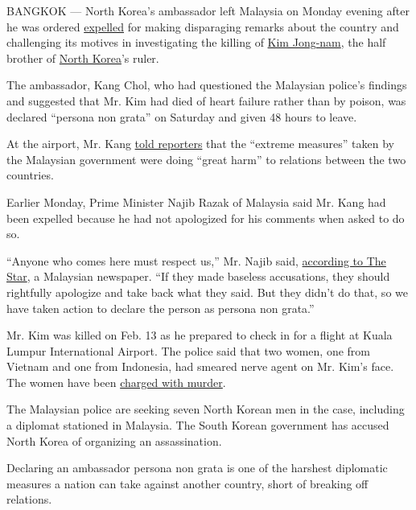 BANGKOK --- North Korea's ambassador left Malaysia on Monday evening
after he was ordered
\href{https://www.nytimes3xbfgragh.onion/2017/03/04/world/asia/malaysia-north-korea-kim-jong-nam.html}{expelled}
for making disparaging remarks about the country and challenging its
motives in investigating the killing of
\href{https://www.nytimes3xbfgragh.onion/2017/02/15/world/asia/kim-jong-nam-assassination-north-korea.html}{Kim
Jong-nam}, the half brother of
\href{https://www.nytimes3xbfgragh.onion/topic/destination/north-korea?inline=nyt-geo}{North
Korea}'s ruler.

The ambassador, Kang Chol, who had questioned the Malaysian police's
findings and suggested that Mr. Kim had died of heart failure rather
than by poison, was declared ``persona non grata'' on Saturday and given
48 hours to leave.

At the airport, Mr. Kang
\href{http://www.channelnewsasia.com/news/asiapacific/expelled-north-korean-envoy-says-malaysia-s-extreme-measures/3572102.html?utm_source=dlvr.it\&utm_medium=twitter}{told
reporters} that the ``extreme measures'' taken by the Malaysian
government were doing ``great harm'' to relations between the two
countries.

Earlier Monday, Prime Minister Najib Razak of Malaysia said Mr. Kang had
been expelled because he had not apologized for his comments when asked
to do so.

``Anyone who comes here must respect us,'' Mr. Najib said,
\href{http://www.thestar.com.my/news/nation/2017/03/06/malaysian-leaders-double-down-on-n-korea/}{according
to The Star}, a Malaysian newspaper. ``If they made baseless
accusations, they should rightfully apologize and take back what they
said. But they didn't do that, so we have taken action to declare the
person as persona non grata.''

Mr. Kim was killed on Feb. 13 as he prepared to check in for a flight at
Kuala Lumpur International Airport. The police said that two women, one
from Vietnam and one from Indonesia, had smeared nerve agent on Mr.
Kim's face. The women have been
\href{https://www.nytimes3xbfgragh.onion/2017/02/28/world/asia/north-korea-kim-jong-nam-death.html}{charged
with murder}.

The Malaysian police are seeking seven North Korean men in the case,
including a diplomat stationed in Malaysia. The South Korean government
has accused North Korea of organizing an assassination.

Declaring an ambassador persona non grata is one of the harshest
diplomatic measures a nation can take against another country, short of
breaking off relations.

